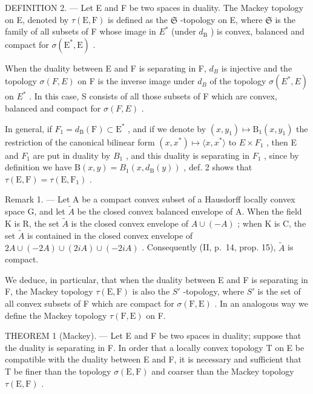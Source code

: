 DEFINITION 2. --- Let E and F be two spaces in duality. The Mackey topology on E, denoted by \(\tau(\mathrm{E},\mathrm{F})\) is defined as the \(\mathfrak{S}\) -topology on E, where \(\mathfrak{S}\) is the family of all subsets of F whose image in \(E^{*}\) (under \(d_{\mathrm{B}}\) ) is convex, balanced and compact for \(\sigma(\mathrm{E}^{*},\mathrm{E})\) .

When the duality between E and F is separating in F, \(d_{B}\) is injective and the topology \(\sigma(F, E)\) on F is the inverse image under \(d_{B}\) of the topology \(\sigma(E^{*}, E)\) on \(E^{*}\) . In this case, S consists of all those subsets of F which are convex, balanced and compact for \(\sigma(F, E)\) .

In general, if \(F_{1}=d_{\mathrm{B}}(\mathrm{F})\subset\mathrm{E}^{*}\) , and if we denote by \((x,y_{1})\mapsto\mathrm{B}_{1}(x,y_{1})\) the restriction of the canonical bilinear form \((x,x^{*})\mapsto\langle x,x^{*}\rangle\) to \(E\times F_{1}\) , then E and \(F_{1}\) are put in duality by \(B_{1}\) , and this duality is separating in \(F_{1}\) , since by definition we have \(\mathrm{B}(x,y)=B_{1}(x,d_{\mathrm{B}}(y))\) , def. 2 shows that \(\tau(\mathrm{E},\mathrm{F})=\tau(\mathrm{E},\mathrm{F}_{1})\) .

Remark 1. --- Let A be a compact convex subset of a Hausdorff locally convex space G, and let \(\tilde{A}\) be the closed convex balanced envelope of A. When the field K is R, the set \(\tilde{A}\) is the closed convex envelope of \(A \cup (-A)\) ; when K is C, the set \(\tilde{A}\) is contained in the closed convex envelope of \(2A \cup (-2A) \cup (2iA) \cup (-2iA)\) . Consequently (II, p.~14, prop. 15), \(\tilde{A}\) is compact.

We deduce, in particular, that when the duality between E and F is separating in F, the Mackey topology \(\tau(\mathrm{E},\mathrm{F})\) is also the \(S'\) -topology, where \(S'\) is the set of all convex subsets of F which are compact for \(\sigma(\mathrm{F},\mathrm{E})\) . In an analogous way we define the Mackey topology \(\tau(\mathrm{F},\mathrm{E})\) on F.

THEOREM 1 (Mackey). --- Let E and F be two spaces in duality; suppose that the duality is separating in F. In order that a locally convex topology T on E be compatible with the duality between E and F, it is necessary and sufficient that T be finer than the topology \(\sigma(\mathrm{E},\mathrm{F})\) and coarser than the Mackey topology \(\tau(\mathrm{E},\mathrm{F})\) .

